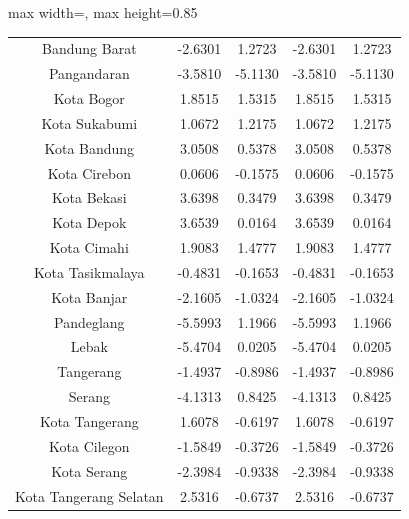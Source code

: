 \begin{table}[H]
\begin{adjustbox}{max width=\textwidth, max height=0.85\textheight}
\begin{tabular}{|c|c|c|c|c|}
Bandung Barat & -2.6301 & 1.2723 & -2.6301 & 1.2723 \\
Pangandaran & -3.5810 & -5.1130 & -3.5810 & -5.1130 \\
Kota Bogor & 1.8515 & 1.5315 & 1.8515 & 1.5315 \\
Kota Sukabumi & 1.0672 & 1.2175 & 1.0672 & 1.2175 \\
Kota Bandung & 3.0508 & 0.5378 & 3.0508 & 0.5378 \\
Kota Cirebon & 0.0606 & -0.1575 & 0.0606 & -0.1575 \\
Kota Bekasi & 3.6398 & 0.3479 & 3.6398 & 0.3479 \\
Kota Depok & 3.6539 & 0.0164 & 3.6539 & 0.0164 \\
Kota Cimahi & 1.9083 & 1.4777 & 1.9083 & 1.4777 \\
Kota Tasikmalaya & -0.4831 & -0.1653 & -0.4831 & -0.1653 \\
Kota Banjar & -2.1605 & -1.0324 & -2.1605 & -1.0324 \\
Pandeglang & -5.5993 & 1.1966 & -5.5993 & 1.1966 \\
Lebak & -5.4704 & 0.0205 & -5.4704 & 0.0205 \\
Tangerang & -1.4937 & -0.8986 & -1.4937 & -0.8986 \\
Serang & -4.1313 & 0.8425 & -4.1313 & 0.8425 \\
Kota Tangerang & 1.6078 & -0.6197 & 1.6078 & -0.6197 \\
Kota Cilegon & -1.5849 & -0.3726 & -1.5849 & -0.3726 \\
Kota Serang & -2.3984 & -0.9338 & -2.3984 & -0.9338 \\
Kota Tangerang Selatan & 2.5316 & -0.6737 & 2.5316 & -0.6737 \\
\hline
\end{tabular}
\end{adjustbox}
\end{table}